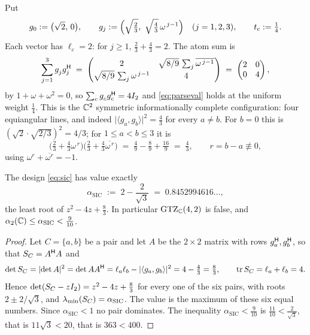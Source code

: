 \begin{example}[Lean]\label{ex:sic}
Put
\begin{equation}\label{eq:sic}
  g_0:=\bigl(\sqrt2,\,0\bigr),
  \qquad
  g_j:=\Bigl(\sqrt{\tfrac23},\ \sqrt{\tfrac43}\,\omega^{\,j-1}\Bigr)
  \quad(j=1,2,3),
  \qquad t_c:=\tfrac14 .
\end{equation}
Each vector has $\ell_c=2$: for $j\ge1$, $\tfrac23+\tfrac43=2$.  The atom
sum is
\[
  \sum_{j=1}^{3} g_j^{\vphantom{\mathsf{H}}}g_j\adj
  \;=\;\begin{pmatrix}2&\sqrt{8/9}\,\sum_j\overline{\omega^{\,j-1}}\\[2pt]
        \sqrt{8/9}\,\sum_j\omega^{\,j-1}&4\end{pmatrix}
  \;=\;\begin{pmatrix}2&0\\0&4\end{pmatrix},
\]
by $1+\omega+\omega^{2}=0$, so
$\sum_c g_c^{\vphantom{\mathsf{H}}}g_c\adj=4I_2$ and \eqref{eq:parseval} holds at
the uniform weight $\tfrac14$.  This is the $\mathbb{C}^2$ symmetric
informationally complete configuration: four equiangular lines, and indeed
$\lvert\langle g_a,g_b\rangle\rvert^{2}=\tfrac43$ for every $a\ne b$.  For
$b=0$ this is $(\sqrt2\cdot\sqrt{2/3})^2=4/3$; for
$1\le a<b\le3$ it is
\[
  \bigl(\tfrac23+\tfrac43\omega^{\,r}\bigr)
  \bigl(\tfrac23+\tfrac43\overline{\omega^{\,r}}\bigr)
  \;=\;\tfrac49-\tfrac89+\tfrac{16}9\;=\;\tfrac43,
  \qquad r=b-a\not\equiv0,
\]
using $\omega^{r}+\overline{\omega^{r}}=-1$.
\end{example}

\begin{lemma}[Lean]\label{lem:sicvalue}
The design \eqref{eq:sic} has value exactly
\[
  \alpha_{\mathrm{SIC}}\;:=\;2-\frac{2}{\sqrt3}\;=\;0.8452994616\ldots,
\]
the least root of $z^{2}-4z+\tfrac83$.  In particular $\mathrm{GTZ}_{\mathbb{C}}(4,2)$ is
false, and $\alpha_2(\mathbb{C})\le\alpha_{\mathrm{SIC}}<\tfrac9{10}$.
\end{lemma}

\begin{proof}
Let $C=\{a,b\}$ be a pair and let $A$ be the $2\times2$ matrix with rows
$g_a^{\mathsf{H}},g_b^{\mathsf{H}}$, so that $S_{C}=A^{\mathsf{H}} A$ and
\[
  \det S_{C}=\lvert\det A\rvert^{2}=\det AA^{\mathsf{H}}
  =\ell_a\ell_b-\lvert\langle g_a,g_b\rangle\rvert^{2}
  =4-\tfrac43=\tfrac83 ,
  \qquad \operatorname{tr}S_{C}=\ell_a+\ell_b=4 .
\]
Hence $\det(S_{C}-zI_2)=z^{2}-4z+\tfrac83$ for every one of the six pairs,
with roots $2\pm2/\sqrt3$, and $\lambda_{\min}(S_{C})=\alpha_{\mathrm{SIC}}$.  The value is the
maximum of these six equal numbers.  Since $\alpha_{\mathrm{SIC}}<1$ no pair dominates.
The inequality $\alpha_{\mathrm{SIC}}<\tfrac9{10}$ is $\tfrac{11}{10}<\tfrac2{\sqrt3}$,
that is $11\sqrt3<20$, that is $363<400$.
\end{proof}

